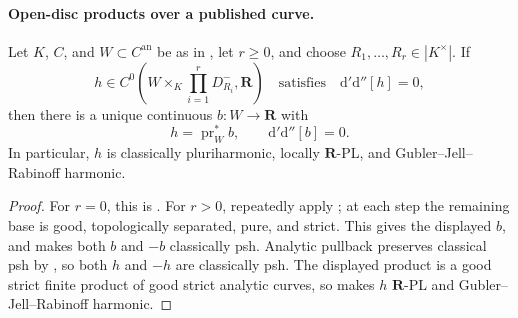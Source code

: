\paragraph{Open-disc products over a published curve.}
\begin{corollary}
\label{cor:p062-open-disc-products-over-curves}
Let \(K\), \(C\), and \(W\subset C^{\mathrm{an}}\) be as in
, let \(r\geq0\), and choose
\(R_1,\ldots,R_r\in|K^\times|\).  If
\[
 h\in C^0\left(W\times_K\prod_{i=1}^rD_{R_i}^-,\mathbf R\right)
 \quad\text{satisfies}\quad
 \mathrm d'\mathrm d''[h]=0,
\]
then there is a unique continuous \(b:W\to\mathbf R\) with
\[
 h=\operatorname{pr}_W^*b,
 \qquad
 \mathrm d'\mathrm d''[b]=0.
\]
In particular, \(h\) is classically pluriharmonic, locally
\(\mathbf R\)-PL, and Gubler--Jell--Rabinoff harmonic.
\end{corollary}

\begin{proof}
For \(r=0\), this is
.  For \(r>0\), repeatedly
apply ; at each step the remaining base
is good, topologically separated, pure, and strict.  This gives the
displayed \(b\), and
 makes both \(b\) and
\(-b\) classically psh.  Analytic pullback preserves classical psh by
\cite[Proposition~4.2(6)]{GR25Classical}, so both \(h\) and \(-h\) are
classically psh.  The displayed product is a good strict finite product of
good strict analytic curves, so
 makes \(h\)
\(\mathbf R\)-PL and Gubler--Jell--Rabinoff harmonic.
\end{proof}


